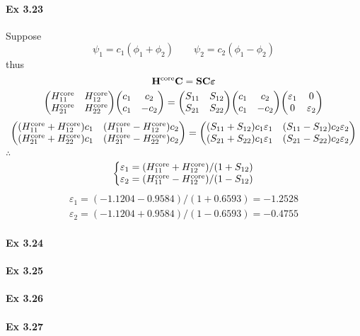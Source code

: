 \documentclass[a4paper]{article}
\DeclareMathOperator{\core}{\mathrm{core}}
\newcommand{\ex}[1]{\paragraph{Ex #1}}
\numberwithin{equation}{subsection}
\begin{document}
\ex{3.23}
Suppose
\begin{equation}\label{key}
\psi_1 = c_1 (\phi_1 + \phi_2) \qquad \psi_2 = c_2 (\phi_1 - \phi_2)
\end{equation}
thus
\begin{equation}\label{key}
\vb{H}^{\core} \vb{C} = \vb{S} \vb{C} \bm\varepsilon
\end{equation}
\begin{equation}\label{key}
\mqty(H_{11}^{\core} & H_{12}^{\core}\\ H_{21}^{\core} & H_{22}^{\core}) \mqty(c_1 & c_2\\ c_1 & -c_2) = \mqty(S_{11} & S_{12}\\ S_{21} & S_{22}) \mqty(c_1 & c_2\\ c_1 & -c_2) \mqty(\varepsilon_1 & 0\\ 0 &\varepsilon_2 ) 
\end{equation}
\begin{equation}\label{key}
\mqty((H_{11}^{\core} + H_{12}^{\core}) c_1 & (H_{11}^{\core} - H_{12}^{\core}) c_2 \\ 
(H_{21}^{\core} + H_{22}^{\core}) c_1 & (H_{21}^{\core} - H_{22}^{\core})c_2)
= \mqty((S_{11} + S_{12}) c_1\varepsilon_1 & (S_{11} - S_{12}) c_2\varepsilon_2\\
(S_{21} + S_{22}) c_1\varepsilon_1 & (S_{21} - S_{22}) c_2\varepsilon_2)
\end{equation}
$ \therefore $
\begin{equation}\label{key}
\left\{ \mqty{\varepsilon_1 = (H_{11}^{\core} + H_{12}^{\core})/(1 + S_{12}) \\
\varepsilon_2 = (H_{11}^{\core} - H_{12}^{\core})/(1 - S_{12})}
\right.
\end{equation}
\begin{align}
\varepsilon_1 = (-1.1204-0.9584)/(1+0.6593) = -1.2528\\
\varepsilon_2 = (-1.1204+0.9584)/(1-0.6593) = -0.4755
\end{align}

\ex{3.24}


\ex{3.25}


\ex{3.26}


\ex{3.27}
\end{document}
